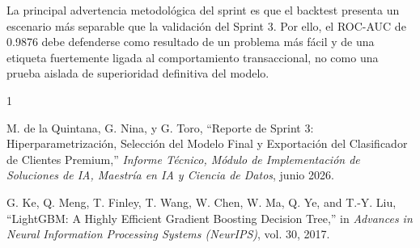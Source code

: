 \documentclass[journal,letterpaper]{IEEEtran}
\begin{document}
La principal advertencia metodológica del sprint es que el backtest presenta un escenario más separable que la validación del Sprint 3. Por ello, el ROC-AUC de 0.9876 debe defenderse como resultado de un problema más fácil y de una etiqueta fuertemente ligada al comportamiento transaccional, no como una prueba aislada de superioridad definitiva del modelo.

\begin{thebibliography}{1}

M. de la Quintana, G. Nina, y G. Toro,
``Reporte de Sprint 3: Hiperparametrización, Selección del Modelo Final y Exportación del Clasificador de Clientes Premium,''
\textit{Informe Técnico, Módulo de Implementación de Soluciones de IA, Maestría en IA y Ciencia de Datos}, junio 2026.

G. Ke, Q. Meng, T. Finley, T. Wang, W. Chen, W. Ma, Q. Ye, and T.-Y. Liu,
``LightGBM: A Highly Efficient Gradient Boosting Decision Tree,''
in \textit{Advances in Neural Information Processing Systems (NeurIPS)}, vol. 30, 2017.

\end{thebibliography}
\end{document}
